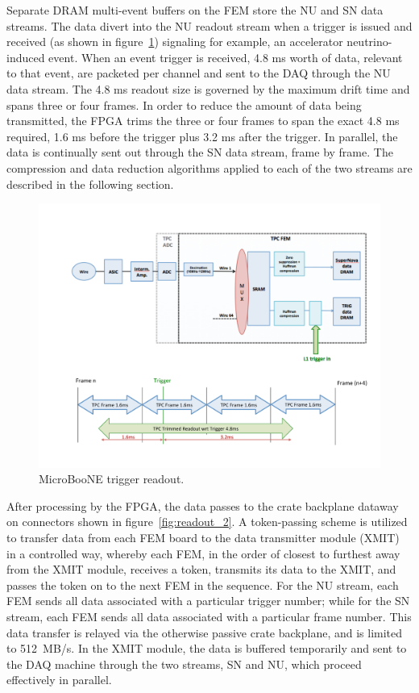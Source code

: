 Separate DRAM multi-event buffers on the FEM store the NU and SN data streams. The data divert into the NU readout stream when a trigger is issued and received (as shown in figure~\ref{fig:readout_4}) signaling for example, an accelerator neutrino-induced event. When an event trigger is received, 4.8 ms worth of data, relevant to that event, are packeted per channel and sent to the DAQ through the NU data stream. The 4.8 ms readout size is governed by the maximum drift time and spans three or four frames. In order to reduce the amount of data being transmitted, the FPGA trims the three or four frames to span the exact 4.8 ms required, 1.6 ms before the trigger plus 3.2 ms after the trigger. In parallel, the data is continually sent out through the SN data stream, frame by frame. The compression and data reduction algorithms applied to each of the two streams are described in the following section.
 
\begin{figure}
\centering
\includegraphics[width=0.8\linewidth]{./figures/readout_4.pdf}%
\caption{\label{fig:readout_4}MicroBooNE trigger readout.}
\end{figure}

After processing by the FPGA, the data passes to the crate backplane dataway on connectors shown in figure~\ref{fig:readout_2}. A token-passing scheme is utilized to transfer data from each FEM board to the data transmitter module (XMIT) in a controlled way, whereby each FEM, in the order of closest to furthest away from the XMIT module, receives a token, transmits its data to the XMIT, and passes the token on to the next FEM in the sequence. For the NU stream, each FEM sends all data associated with a particular trigger number; while for the SN stream, each FEM sends all data associated with a particular frame number. This data transfer is relayed via the otherwise passive crate backplane, and is limited to 512~MB/s. In the XMIT module, the data is buffered temporarily and sent to the DAQ machine through the two streams, SN and NU, which proceed effectively in parallel.

